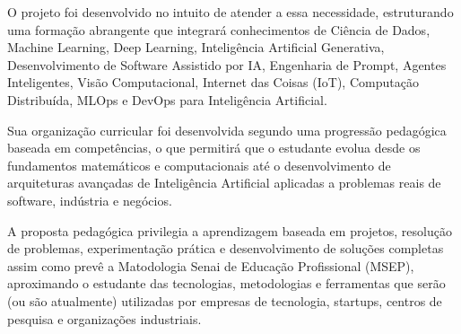 O projeto foi desenvolvido no intuito de atender a essa necessidade, estruturando uma formação abrangente que integrará conhecimentos de Ciência de Dados, Machine Learning, Deep Learning, Inteligência Artificial Generativa, Desenvolvimento de Software Assistido por IA, Engenharia de Prompt, Agentes Inteligentes, Visão Computacional, Internet das Coisas (IoT), Computação Distribuída, MLOps e DevOps para Inteligência Artificial.

Sua organização curricular foi desenvolvida segundo uma progressão pedagógica baseada em competências, o que permitirá que o estudante evolua desde os fundamentos matemáticos e computacionais até o desenvolvimento de arquiteturas avançadas de Inteligência Artificial aplicadas a problemas reais de software, indústria e negócios.

A proposta pedagógica privilegia a aprendizagem baseada em projetos, resolução de problemas, experimentação prática e desenvolvimento de soluções completas assim como prevê a Matodologia Senai de Educação Profissional (MSEP), aproximando o estudante das tecnologias, metodologias e ferramentas que serão (ou são atualmente) utilizadas por empresas de tecnologia, startups, centros de pesquisa e organizações industriais.